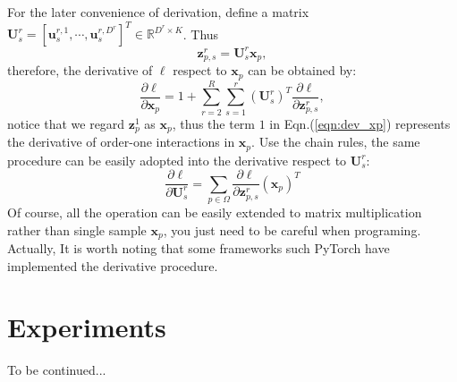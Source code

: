 \documentclass[a4paper,4pt]{article}
\begin{document}
For the later convenience of derivation, define a matrix 
$\bm{U}^r_s=[\bm{u}_s^{r,1},\cdots,\bm{u}_s^{r,D^r}]^T \in \mathbb{R}^{D^r\times K}$.
Thus 
\begin{equation}
    \bm{z}^r_{p,s}=\bm{U}_s^r\bm{x}_p,
\end{equation}
therefore, the derivative of $\ell$ respect to $\bm{x}_p$ can be obtained by:
\begin{equation}\label{eqn:dev_xp}
    \frac{\partial \ell}{\partial \bm{x}_p}
    =1+\sum_{r=2}^R \sum_{s=1}^r (\bm{U}^r_s)^T \frac{\partial \ell}{\partial \bm{z}^r_{p,s}},
\end{equation}
notice that we regard $\bm{z}^1_p$ as $\bm{x}_p$, thus the term $1$ in Eqn.(\ref{eqn:dev_xp}) represents the derivative of order-one interactions in $\bm{x}_p$.
Use the chain rules, the same procedure can be easily adopted into the derivative respect to
$\bm{U}^r_s$:
\begin{equation}
    \frac{\partial \ell}{\partial \bm{U}^r_s} 
    =\sum_{p\in \Omega}
    \frac{\partial \ell}{\partial \bm{z}^r_{p,s}} (\bm{x}_p)^T
\end{equation}
Of course, all the operation can be easily extended to matrix multiplication rather
than single sample $\bm{x}_p$, you just need to be careful when programing. Actually,
It is worth noting that some frameworks such PyTorch have implemented the derivative procedure.
\section{Experiments}
To be continued...
{}

\end{document}

